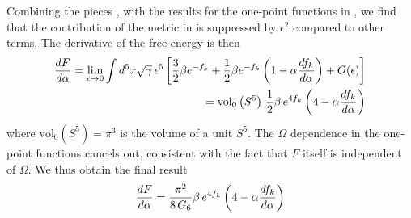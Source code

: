 \documentclass[12pt]{article}
\begin{document}
Combining the pieces , with the results for the one-point functions in , we find that the contribution of the metric in is suppressed by $\epsilon^2$ compared to other terms. The derivative of the free energy is then
\begin{eqnarray}
{d F \over d \alpha} = \lim_{\epsilon \rightarrow 0} \int d^5 x \sqrt{\gamma} \, \epsilon^5 \left[{3 \over 2} \beta e^{- f_k} + {1\over 2} \beta e^{- f_k}\left(1 -\alpha {d f_k \over d \alpha} \right) + O(\epsilon) \right]
\nonumber\\
= \mathrm{vol}_0\left(S^5 \right) \, {1\over 2} \beta \,e^{4 f_k} \left(4 - \alpha {d f_k \over d \alpha} \right)
\end{eqnarray}
where $\mathrm{vol}_0(S^5)=\pi^3$ is the volume of a unit $S^5$. The $\Omega$ dependence in the one-point functions cancels out, consistent with the fact that  $F$ itself is independent of $\Omega$.
We thus obtain the final result
\begin{eqnarray}
{d F \over d \alpha} =  {\pi^2 \over 8\, G_6}  \beta \,e^{4 f_k} \left(4-\alpha {d f_k \over d \alpha} \right)
\end{eqnarray}
\end{document}
